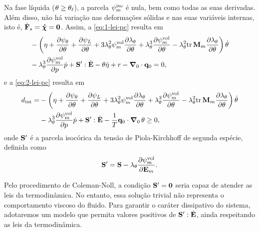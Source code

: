 \documentclass[Tese.tex]{subfiles}
\begin{document}
Na fase líquida ($\theta \geq \theta_\ell$), a parcela $\psi_m^\text{iso}$ é nula, bem como todas as suas derivadas. Além disso, não há variação nas deformações sólidas e nas suas variáveis internas, isto é, $\dot{\mathbf{F}}_s = \boldsymbol{\dot{\chi}} = \mathbf{0}$. Assim, a \cref{eq:1-lei-pc} resulta em
\begin{equation}
\begin{aligned}
&-\left(\eta+\dfrac{\partial\psi_{\theta}}{\partial\theta} + \dfrac{\partial\psi_L}{\partial\theta} + 3\lambda_{\theta}^2\psi_m^\text{vol}\dfrac{\partial\lambda_{\theta}}{\partial\theta} + \lambda_{\theta}^3\dfrac{\partial\psi_m^\text{vol}}{\partial\theta} - \lambda_{\theta}^2\text{tr}\,\mathbf{M}_m\dfrac{\partial\lambda_{\theta}}{\partial\theta}\right)\dot{\theta} \\
&- \lambda_{\theta}^3\dfrac{\partial\psi_m^\text{vol}}{\partial p}\dot{p}+\mathbf{S}':\dot{\mathbf{E}} - \theta \dot{\eta} + r - \boldsymbol{\nabla}_0\cdot\mathbf{q}_0 = 0, \label{eq:1-lei-liquid}
\end{aligned}
\end{equation}
e a \cref{eq:2-lei-pc} resulta em
\begin{equation}
\begin{aligned}
d_\text{int} = &-\left(\eta+\dfrac{\partial\psi_{\theta}}{\partial\theta} + \dfrac{\partial\psi_L}{\partial\theta} + 3\lambda_{\theta}^2\psi_m^\text{vol}\dfrac{\partial\lambda_{\theta}}{\partial\theta} + \lambda_{\theta}^3\dfrac{\partial\psi_m^\text{vol}}{\partial\theta} - \lambda_{\theta}^2\text{tr}\,\mathbf{M}_m\dfrac{\partial\lambda_{\theta}}{\partial\theta}\right)\dot{\theta} \\
&- \lambda_{\theta}^3\dfrac{\partial\psi_m^\text{vol}}{\partial p}\dot{p}+\mathbf{S}':\dot{\mathbf{E}} - \dfrac{1}{T}\mathbf{q}_0\cdot\boldsymbol{\nabla}_0\,\theta \geq 0, \label{eq:2-lei-liquid}
\end{aligned}
\end{equation}
onde $\mathbf{S}'$ é a parcela isocórica da tensão de Piola-Kirchhoff de segunda espécie, definida como
\begin{equation}
\mathbf{S}' = \mathbf{S} - \lambda_{\theta}\dfrac{\partial\psi_m^\text{vol}}{\partial\mathbf{E}_m}.
\end{equation}

Pelo procedimento de Coleman-Noll, a condição $\mathbf{S}' = \mathbf{0}$ seria capaz de atender as leis da termodinâmica. No entanto, essa solução trivial não representa o comportamento viscoso do fluido. Para garantir o caráter dissipativo do sistema, adotaremos um modelo que permita valores positivos de $\mathbf{S}':\dot{\mathbf{E}}$, ainda respeitando as leis da termodinâmica.
\end{document}
